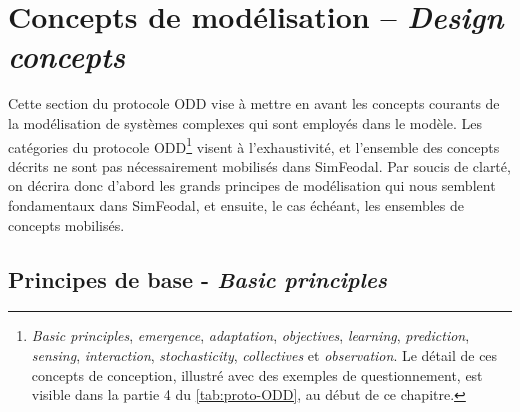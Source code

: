 
\let\orisectionmark\sectionmark
\renewcommand\sectionmark[1]{}%
\section[Concepts de modélisation-- \textit{Design concepts}]{Concepts de modélisation -- \large{\textit{Design concepts}}}
\orisectionmark{Concepts de modélisation}
\let\sectionmark\orisectionmark

Cette section du protocole ODD vise à mettre en avant les concepts courants de la modélisation de systèmes complexes qui sont employés dans le modèle.
Les catégories du protocole ODD\footnote{
\textit{Basic principles}, \textit{emergence}, \textit{adaptation}, \textit{objectives}, \textit{learning}, \textit{prediction}, \textit{sensing}, \textit{interaction}, \textit{stochasticity}, \textit{collectives } et \textit{observation}.
Le détail de ces \og concepts de conception\fg{}, illustré avec des exemples de questionnement, est visible dans la partie 4 du \cref{tab:proto-ODD}, au début de ce chapitre.
} visent à l'exhaustivité, et l'ensemble des concepts décrits ne sont pas nécessairement mobilisés dans SimFeodal.
Par soucis de clarté, on décrira donc d'abord les grands principes de modélisation qui nous semblent fondamentaux dans SimFeodal, et ensuite, le cas échéant, les ensembles de concepts mobilisés.

\subsection{Principes de base - \textit{Basic principles}}


